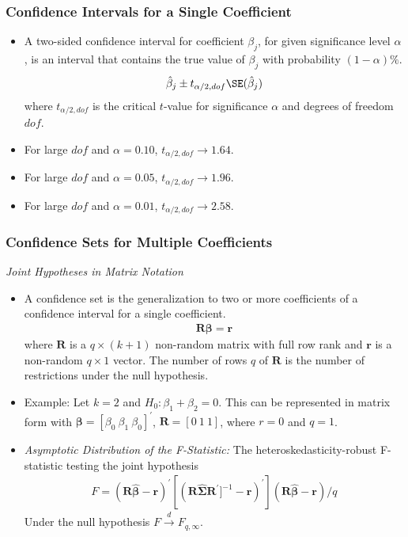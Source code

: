 

\begin{frame}
\frametitle{Confidence Intervals for a Single Coefficient}
\begin{itemize}
\item A two-sided confidence interval for coefficient $\beta_{j}$, for given significance level $\alpha$, is an interval that contains the true value of $\beta_{j}$ with probability $(1-\alpha)\%$.
\begin{align*}
\hat{\beta}_{j} \pm t_{\alpha/2,dof} \SE(\hat{\beta}_{j})
\end{align*}
where $t_{\alpha/2,dof}$ is the critical $t$-value for significance $\alpha$ and degrees of freedom $dof$.
\item For large $dof$ and $\alpha=0.10$, $t_{\alpha/2,dof}\to1.64$.
\item For large $dof$ and $\alpha=0.05$, $t_{\alpha/2,dof}\to1.96$.
\item For large $dof$ and $\alpha=0.01$, $t_{\alpha/2,dof}\to2.58$.
\end{itemize}
\end{frame}


\begin{frame}
\frametitle{Confidence Sets for Multiple Coefficients}
\emph{Joint Hypotheses in Matrix Notation}
\begin{itemize}
\item A confidence set is the generalization to two or more coefficients of a confidence interval for a single coefficient.
\begin{align*}
\symbf{R} \symbf{\beta} = \symbf{r}
\end{align*}
where $\symbf{R}$ is a $q \times (k+1)$ non-random matrix with full row rank and $\symbf{r}$ is a non-random $q \times 1$ vector. The number of rows $q$ of $\symbf{R}$ is the number of restrictions under the null hypothesis. 
\item Example: Let $k=2$ and $H_{0}\colon\beta_{1}+\beta_{2}=0$. This can be represented in matrix form with $\symbf{\beta}=[\beta_{0}~\beta_{1}~\beta_{0}]^{\prime}$, $\symbf{R}=[0~1~1]$, where $r=0$ and $q=1$. 
\item \emph{Asymptotic Distribution of the F-Statistic:}
\newlineqquad
The heteroskedasticity-robust F-statistic testing the joint hypothesis
\begin{align*}
F = (\symbf{R}\symbf{\hat{\beta}}-\symbf{r})^{\prime} 
[(\symbf{R}\symbf{\hat{\Sigma}}\symbf{R}^{\prime}]^{-1}-\symbf{r})^{\prime}]
(\symbf{R}\symbf{\hat{\beta}}-\symbf{r})/q
\end{align*}
Under the null hypothesis $F\xrightarrow{d}F_{q,\infty}$.
\end{itemize}
\end{frame}


